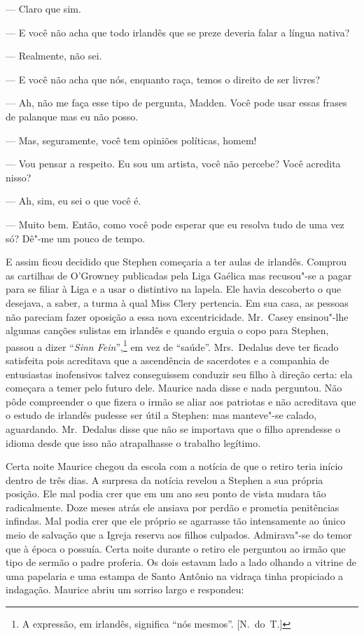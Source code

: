 --- Claro que sim.

--- E você não acha que todo irlandês que se preze deveria falar
a língua nativa?

--- Realmente, não sei.

--- E você não acha que nós, enquanto raça, temos o direito de
ser livres?

--- Ah, não me faça esse tipo de pergunta, Madden.  Você pode
usar essas frases de palanque mas eu não posso.

--- Mas, seguramente, você tem opiniões políticas, homem!

--- Vou pensar a respeito.  Eu sou um artista, você não percebe?
Você acredita nisso?

--- Ah, sim, eu sei o que você é.

--- Muito bem.  Então, como você pode esperar que eu resolva tudo
de uma vez só?  Dê"-me um pouco de tempo.

E assim ficou decidido que Stephen começaria a ter aulas de
irlandês.  Comprou as cartilhas de O’Growney publicadas pela Liga
Gaélica mas recusou"-se a pagar para se filiar à Liga e a usar o
distintivo na lapela.  Ele havia descoberto o que desejava, a saber, a
turma à qual Miss Clery pertencia.  Em sua casa, as pessoas não
pareciam fazer oposição a essa nova excentricidade.  Mr.~Casey
ensinou"-lhe algumas canções sulistas em irlandês e quando erguia o copo
para Stephen, passou a dizer “\textit{Sinn Fein}”,\footnote{ A
expressão, em irlandês, significa “nós mesmos”. [N.~do~T.]} em vez de
“saúde”.  Mrs.~Dedalus deve ter ficado satisfeita pois acreditava que
a ascendência de sacerdotes e a companhia de entusiastas inofensivos
talvez conseguissem conduzir seu filho à direção certa: ela começara a
temer pelo futuro dele.  Maurice nada disse e nada perguntou.  Não pôde
compreender o que fizera o irmão se aliar aos patriotas e não
acreditava que o estudo de irlandês pudesse ser útil a Stephen: mas
manteve"-se calado, aguardando.  Mr.~Dedalus disse que não se importava
que o filho aprendesse o idioma desde que isso não atrapalhasse o
trabalho legítimo.

Certa noite Maurice chegou da escola com a notícia de que o retiro
teria início dentro de três dias.  A surpresa da notícia revelou a
Stephen a sua própria posição.  Ele mal podia crer que em um ano seu
ponto de vista mudara tão radicalmente.  Doze meses atrás ele ansiava
por perdão e prometia penitências infindas.  Mal podia crer que ele
próprio se agarrasse tão intensamente ao único meio de salvação que a
Igreja reserva aos filhos culpados.  Admirava"-se do temor que à época o
possuía.  Certa noite durante o retiro ele perguntou ao irmão que tipo
de sermão o padre proferia.  Os dois estavam lado a lado olhando a
vitrine de uma papelaria e uma estampa de Santo Antônio na vidraça
tinha propiciado a indagação.  Maurice abriu um sorriso largo e
respondeu:

